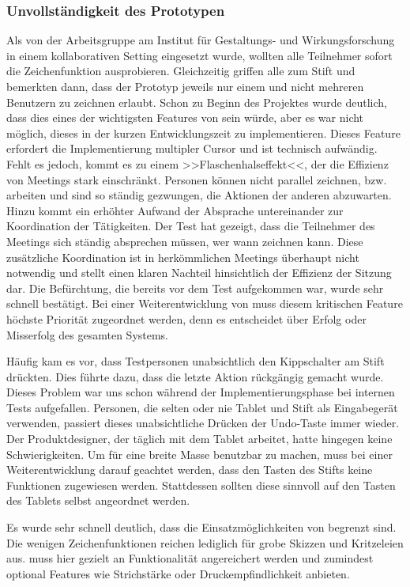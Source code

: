 \subsubsection{Unvollständigkeit des Prototypen}
Als \scribbler von der Arbeitsgruppe am Institut für Gestaltungs- und Wirkungsforschung in einem kollaborativen Setting eingesetzt wurde, wollten alle Teilnehmer sofort die Zeichenfunktion ausprobieren. Gleichzeitig griffen alle zum Stift und bemerkten dann, dass der Prototyp jeweils nur einem und nicht mehreren Benutzern zu zeichnen erlaubt. Schon zu Beginn des Projektes wurde deutlich, dass dies eines der wichtigsten Features von \scribbler sein würde, aber es war nicht möglich, dieses in der kurzen Entwicklungszeit zu implementieren. Dieses Feature erfordert die Implementierung multipler Cursor und ist technisch aufwändig. Fehlt es jedoch, kommt es zu einem >>Flaschenhalseffekt<<, der die Effizienz von Meetings stark einschränkt. Personen können nicht parallel zeichnen, bzw. arbeiten und sind so ständig gezwungen, die Aktionen der anderen abzuwarten. Hinzu kommt ein erhöhter Aufwand der Absprache untereinander zur Koordination der Tätigkeiten. Der Test hat gezeigt, dass die Teilnehmer des Meetings sich ständig absprechen müssen, wer wann zeichnen kann. Diese zusätzliche Koordination ist in herkömmlichen Meetings überhaupt nicht notwendig und stellt einen klaren Nachteil hinsichtlich der Effizienz der Sitzung dar. Die Befürchtung, die bereits vor dem Test aufgekommen war, wurde sehr schnell bestätigt. Bei einer Weiterentwicklung von \scribbler muss diesem kritischen Feature höchste Priorität zugeordnet werden, denn es entscheidet über Erfolg oder Misserfolg des gesamten Systems.

\medskip Häufig kam es vor, dass Testpersonen unabsichtlich den Kippschalter am Stift drückten. Dies führte dazu, dass die letzte Aktion rückgängig gemacht wurde. Dieses Problem war uns schon während der Implementierungsphase bei internen Tests aufgefallen. Personen, die selten oder nie Tablet und Stift als Eingabegerät verwenden, passiert dieses unabsichtliche Drücken der Undo-Taste immer wieder. Der Produktdesigner, der täglich mit dem Tablet arbeitet, hatte hingegen keine Schwierigkeiten. Um \scribbler für eine breite Masse benutzbar zu machen, muss bei einer Weiterentwicklung darauf geachtet werden, dass den Tasten des Stifts keine Funktionen zugewiesen werden. Stattdessen sollten diese sinnvoll auf den Tasten des Tablets selbst angeordnet werden.

\medskip Es wurde sehr schnell deutlich, dass die Einsatzmöglichkeiten von \scribbler begrenzt sind. Die wenigen Zeichenfunktionen reichen lediglich für grobe Skizzen und Kritzeleien aus. \scribbler muss hier gezielt an Funktionalität angereichert werden und zumindest optional Features wie Strichstärke oder Druckempfindlichkeit anbieten.

